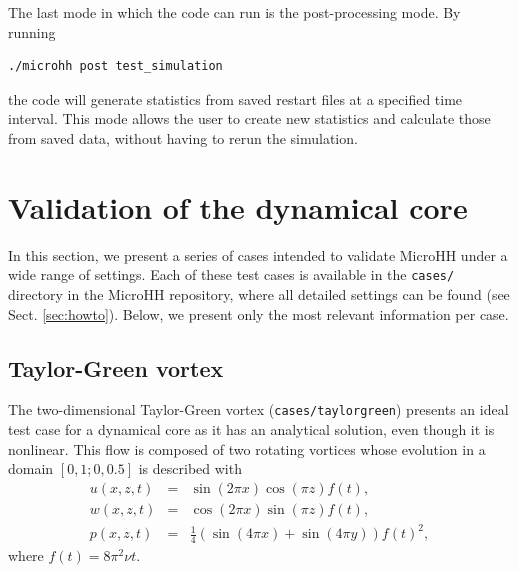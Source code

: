 \documentclass[gmd,manuscript]{copernicus}
\begin{document}
The last mode in which the code can run is the post-processing mode. By running 
\begin{verbatim}
./microhh post test_simulation
\end{verbatim}
the code will generate statistics from saved restart files at a specified time interval. This mode allows the user to create new statistics and calculate those from saved data, without having to rerun the simulation.

 \section{Validation of the dynamical core} \label{sec:tests}
In this section, we present a series of cases intended to validate MicroHH under a wide range of settings. Each of these test cases is available in the \texttt{cases/} directory in the MicroHH repository, where all detailed settings can be found (see Sect. \ref{sec:howto}). Below, we present only the most relevant information per case.

\subsection{Taylor-Green vortex}
The two-dimensional Taylor-Green vortex (\texttt{cases/taylorgreen}) presents an ideal test case for a dynamical core as it has an analytical solution, even though it is nonlinear. This flow is composed of two rotating vortices whose evolution in a domain $\left[0,1; 0,0.5 \right]$ is described with
\begin{eqnarray}
u(x,z,t) & = & \sin(2\pi x) \cos(\pi z) f(t),\\
w(x,z,t) & = & \cos(2\pi x) \sin(\pi z) f(t),\\
p(x,z,t) & = & \tfrac{1}{4} \left(\sin(4 \pi x) + \sin(4 \pi y) \right) f(t)^2,
\end{eqnarray}
where $f(t) = 8 \pi^2 \nu t$.
\end{document}
